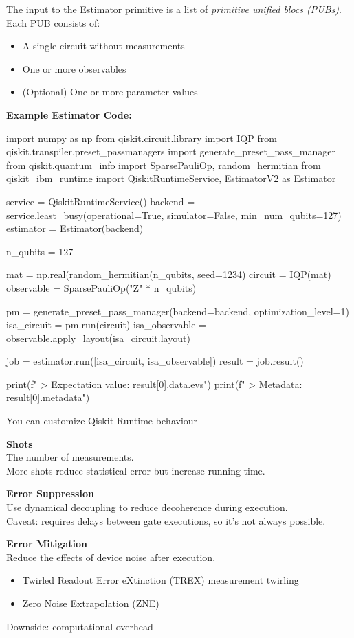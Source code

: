\documentclass{article}
\newcommand{\ms}{\medskip}
\newcommand{\bs}{\bigskip}
\begin{document}
The input to the Estimator primitive is a list of \textit{primitive unified blocs (PUBs)}. Each PUB consists of:
\begin{itemize}
    \item A single circuit without measurements
    \item One or more observables
    \item (Optional) One or more parameter values
\end{itemize}

\textbf{Example Estimator Code:}
\begin{python}
import numpy as np
from qiskit.circuit.library import IQP
from qiskit.transpiler.preset_passmanagers import generate_preset_pass_manager
from qiskit.quantum_info import SparsePauliOp, random_hermitian
from qiskit_ibm_runtime import QiskitRuntimeService, EstimatorV2 as Estimator

service = QiskitRuntimeService()
backend = service.least_busy(operational=True, simulator=False, min_num_qubits=127)
estimator = Estimator(backend)

n_qubits = 127

mat = np.real(random_hermitian(n_qubits, seed=1234)
circuit = IQP(mat)
observable = SparsePauliOp("Z" * n_qubits)

pm = generate_preset_pass_manager(backend=backend, optimization_level=1)
isa_circuit = pm.run(circuit)
isa_observable = observable.apply_layout(isa_circuit.layout)

job = estimator.run([isa_circuit, isa_observable])
result = job.result()

print(f" > Expectation value: {result[0].data.evs}")
print(f" > Metadata: {result[0].metadata}")
\end{python}\bs

You can customize Qiskit Runtime behaviour\ms

\textbf{Shots}\\
The number of measurements.\\
More shots reduce statistical error but increase running time.\ms

\textbf{Error Suppression}\\
Use dynamical decoupling to reduce decoherence during execution.\\
Caveat: requires delays between gate executions, so it's not always possible.\ms

\textbf{Error Mitigation}\\
Reduce the effects of device noise after execution.
\begin{itemize}
    \item Twirled Readout Error eXtinction (TREX) measurement twirling
    \item Zero Noise Extrapolation (ZNE)
\end{itemize}
Downside: computational overhead\ms
\end{document}
